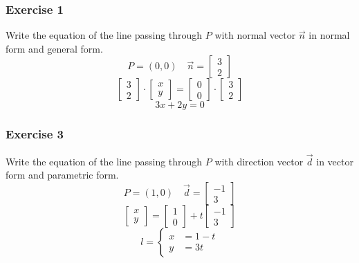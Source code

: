 \documentclass{math}
\begin{document}
\subsubsection*{Exercise 1}
Write the equation of the line passing through \( P \) with normal vector
\( \vec{n} \) in normal form and general form.
\[ P = (0,0) \quad \vec{n} = \begin{bmatrix}3 \\ 2\end{bmatrix} \]
\[ \begin{bmatrix}3 \\ 2\end{bmatrix}\cdot\begin{bmatrix}x \\ y\end{bmatrix} =
  \begin{bmatrix}0 \\ 0\end{bmatrix}\cdot\begin{bmatrix}3 \\ 2\end{bmatrix} \]
\[ 3x+2y = 0 \]

\subsubsection*{Exercise 3}
Write the equation of the line passing through \( P \) with direction vector
\( \vec{d} \) in vector form and parametric form.
\[ P = (1,0) \quad \vec{d} = \begin{bmatrix}-1 \\ 3\end{bmatrix} \]
\[ \begin{bmatrix}x \\ y\end{bmatrix} =
  \begin{bmatrix}1 \\ 0\end{bmatrix}+t\begin{bmatrix}-1 \\ 3\end{bmatrix} \]
\[ l = \begin{cases}
  x &= 1-t \\
  y &= 3t
\end{cases} \]
\end{document}

